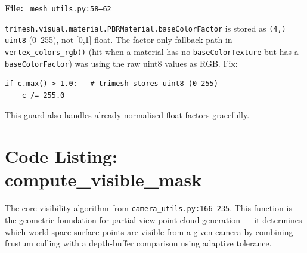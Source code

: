 \textbf{File:} \texttt{\_mesh\_utils.py:58--62}

\texttt{trimesh.visual.material.PBRMaterial.baseColorFactor} is stored as
\texttt{(4,) uint8} (0--255), not [0,1] float. The factor-only fallback path
in \texttt{vertex\_colors\_rgb()} (hit when a material has no
\texttt{baseColorTexture} but has a \texttt{baseColorFactor}) was using the
raw uint8 values as RGB. Fix:

\begin{lstlisting}
if c.max() > 1.0:   # trimesh stores uint8 (0-255)
    c /= 255.0
\end{lstlisting}

This guard also handles already-normalised float factors gracefully.

\section{Code Listing: compute\_visible\_mask}

\label{sec:code-listing}

\noindent The core visibility algorithm from \texttt{camera\_utils.py:166--235}.
This function is the geometric foundation for partial-view point cloud
generation --- it determines which world-space surface points are visible
from a given camera by combining frustum culling with a depth-buffer
comparison using adaptive tolerance.


